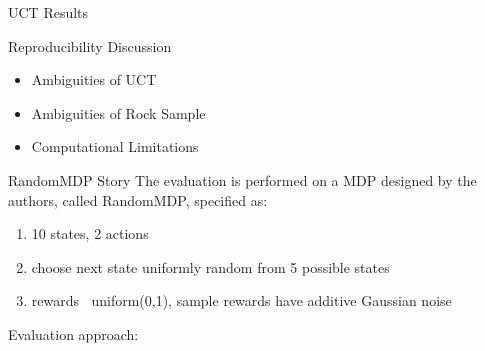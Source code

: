 \documentclass{beamer}
\begin{document}
\begin{frame}{UCT Results}
\begin{figure}[h]
\centering
{}
\hspace{1mm}
\end{figure}
\end{frame}

\begin{frame}{Reproducibility Discussion}
\begin{itemize}
\item Ambiguities of UCT
\item Ambiguities of Rock Sample
\item Computational Limitations
\end{itemize}
\end{frame}


\begin{frame}{RandomMDP Story}
The evaluation is performed on a MDP designed by the authors, called RandomMDP, specified as:
\begin{enumerate}
\item 10 states, 2 actions
\item choose next state uniformly random from 5 possible states
\item rewards $~$ uniform(0,1), sample rewards have additive Gaussian noise
\end{enumerate}
Evaluation approach:


\end{frame}
\end{document}
